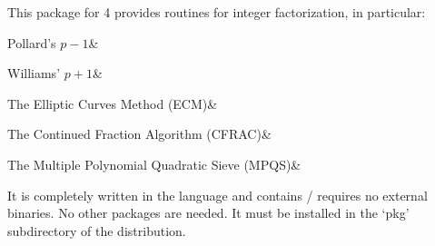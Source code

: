 
This package for {\GAP} 4 provides routines for 
integer factorization, in particular:

\beginitems
Pollard's $p-1$&

Williams' $p+1$&

The Elliptic Curves Method (ECM)&

The Continued Fraction Algorithm (CFRAC)&

The Multiple Polynomial Quadratic Sieve (MPQS)&
\enditems

It is completely written in the {\GAP} language and contains /
requires no external binaries. No other packages are needed.
It must be installed in the `pkg' subdirectory of the
{\GAP} distribution.


